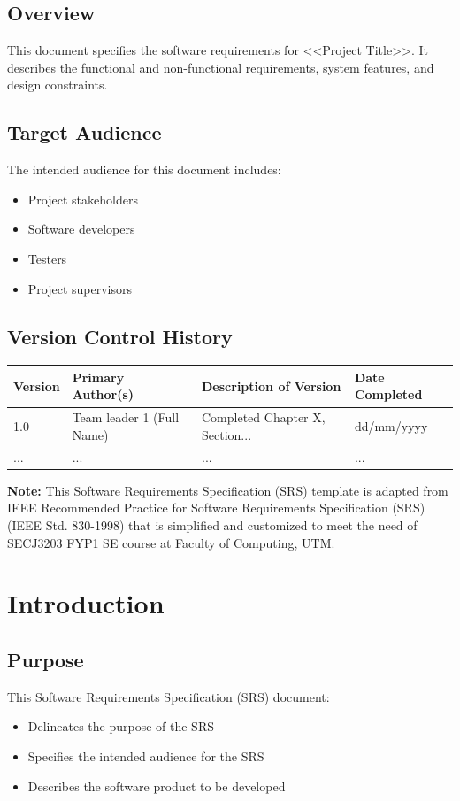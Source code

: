 \documentclass[oneside]{utmsrs}
\begin{document}
\section*{Overview}
This document specifies the software requirements for <<Project Title>>. It describes the functional and non-functional requirements, system features, and design constraints.

\section*{Target Audience}
The intended audience for this document includes:
\begin{itemize}
    \item Project stakeholders
    \item Software developers
    \item Testers
    \item Project supervisors
\end{itemize}

\section*{Version Control History}
\begin{longtable}{|l|l|l|l|}
\hline
\textbf{Version} & \textbf{Primary Author(s)} & \textbf{Description of Version} & \textbf{Date Completed} \\ \hline
1.0 & Team leader 1 (Full Name) & Completed Chapter X, Section... & dd/mm/yyyy \\ \hline
... & ... & ... & ... \\ \hline
\end{longtable}

\textbf{Note:} This Software Requirements Specification (SRS) template is adapted from IEEE Recommended Practice for Software Requirements Specification (SRS) (IEEE Std. 830-1998) that is simplified and customized to meet the need of SECJ3203 FYP1 SE course at Faculty of Computing, UTM.

\tableofcontents

\mainmatter

\chapter{Introduction}
\section{Purpose}
This Software Requirements Specification (SRS) document:
\begin{itemize}
    \item Delineates the purpose of the SRS
    \item Specifies the intended audience for the SRS
    \item Describes the software product to be developed
\end{itemize}
\end{document}

